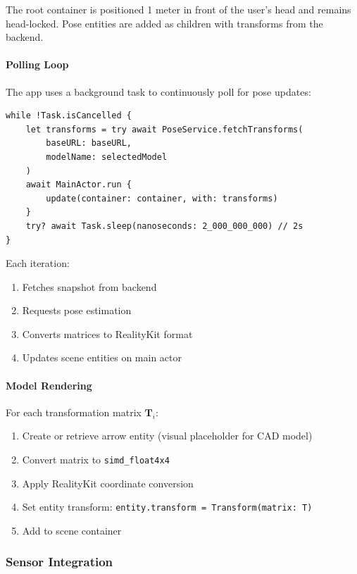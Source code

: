 The root container is positioned 1 meter in front of the user's head and remains head-locked. Pose entities are added as children with transforms from the backend.

\paragraph{Polling Loop}

The app uses a background task to continuously poll for pose updates:

\begin{verbatim}
while !Task.isCancelled {
    let transforms = try await PoseService.fetchTransforms(
        baseURL: baseURL,
        modelName: selectedModel
    )
    await MainActor.run {
        update(container: container, with: transforms)
    }
    try? await Task.sleep(nanoseconds: 2_000_000_000) // 2s
}
\end{verbatim}

Each iteration:
\begin{enumerate}
    \item Fetches snapshot from backend
    \item Requests pose estimation
    \item Converts matrices to RealityKit format
    \item Updates scene entities on main actor
\end{enumerate}

\paragraph{Model Rendering}

For each transformation matrix $\mathbf{T}_i$:
\begin{enumerate}
    \item Create or retrieve arrow entity (visual placeholder for CAD model)
    \item Convert matrix to \texttt{simd\_float4x4}
    \item Apply RealityKit coordinate conversion
    \item Set entity transform: \texttt{entity.transform = Transform(matrix: T)}
    \item Add to scene container
\end{enumerate}

\subsubsection{Sensor Integration}

